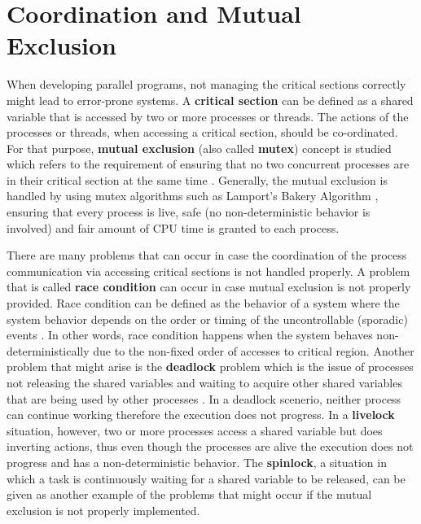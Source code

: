 \section{Coordination and Mutual Exclusion} %
When developing parallel programs, not managing the critical sections correctly might lead to error-prone systems. A \textbf{critical section} can be defined as a shared variable that is accessed by two or more processes or threads. The actions of the processes or threads, when accessing a critical section, should be co-ordinated. For that purpose, \textbf{mutual exclusion} (also called \textbf{mutex}) concept is studied which refers to the requirement of ensuring that no two concurrent processes are in their critical section at the same time \cite{lukas1}. Generally, the mutual exclusion is handled by using mutex algorithms such as Lamport's Bakery Algorithm \cite{lukas1}, ensuring that every process is live, safe (no non-deterministic behavior is involved) and fair amount of CPU time is granted to each process.

There are many problems that can occur in case the coordination of the process communication via accessing critical sections is not handled properly. A problem that is called \textbf{race condition} can occur in case mutual exclusion is not properly provided. Race condition can be defined as the behavior of a system where the system behavior depends on the order or timing of the uncontrollable (sporadic) events \cite{lukas1}. In other words, race condition happens when the system behaves non-deterministically due to the non-fixed order of accesses to critical region. Another problem that might arise is the \textbf{deadlock} problem which is the issue of processes not releasing the shared variables and waiting to acquire other shared variables that are being used by other processes \cite{lukas1}. In a deadlock scenerio, neither process can continue working therefore the execution does not progress. In a \textbf{livelock} situation, however, two or more processes access a shared variable but does inverting actions, thus even though the processes are alive the execution does not progress and has a non-deterministic behavior. The \textbf{spinlock}, a situation in which a task is continuously waiting for a shared variable to be released, can be given as another example of the problems that might occur if the mutual exclusion is not properly implemented.

